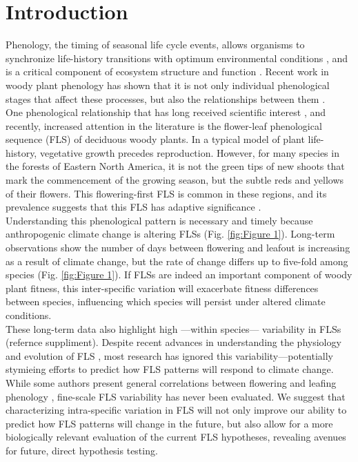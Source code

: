 \documentclass{article}
\begin{document}
\section*{Introduction}
Phenology, the timing of seasonal life cycle events, allows organisms to synchronize life-history transitions with optimum environmental conditions \citep{Forrest2010}, and is a critical component of ecosystem structure and function \citep{Cleland2007,Piao2007}. Recent work in woody plant phenology has shown that it is not only individual phenological stages that affect these processes, but also the relationships between them \citep{Ettinger2018}.\\

 One phenological relationship that has long received scientific interest \citep[see][]{Robertson1895}, and recently, increased attention in the literature \citep{Savage2019, Gougherty2018} is the flower-leaf phenological sequence (FLS) of deciduous woody plants. In a typical model of plant life-history, vegetative growth precedes reproduction. However, for many species in the forests of Eastern North America, it is not the green tips of new shoots that mark the commencement of the growing season, but the subtle reds and yellows of their flowers. This flowering-first FLS is common in these regions, and its prevalence suggests that this FLS has adaptive significance \citep{Rathcke_1985}.\\ 

 Understanding this phenological pattern is necessary and timely because anthropogenic climate change is altering FLSs (Fig. \ref{fig:Figure 1}). Long-term observations show the number of days between flowering and leafout is increasing as a result of climate change, but the rate of change differs up to five-fold among species (Fig. \ref{fig:Figure 1}).  If FLSs are indeed an important component of woody plant fitness, this inter-specific variation will exacerbate fitness differences between species, influencing which species will persist under altered climate conditions.\\

 These long-term data also highlight high ---within species--- variability in FLSs (refernce suppliment). Despite recent advances in understanding the physiology and evolution of FLS \citep{Gougherty2018,Savage2019}, most research has ignored this variability---potentially stymieing efforts to predict how FLS patterns will respond to climate change. While some authors present general correlations between flowering and leafing phenology \citep{Lechowicz_1995, Ettinger2018}, fine-scale FLS variability has never been evaluated. We suggest that characterizing intra-specific variation in FLS will not only improve our ability to predict how FLS patterns will change in the future, but also allow for a more biologically relevant evaluation of the current FLS hypotheses, revealing avenues for future, direct hypothesis testing.\\
\end{document}
